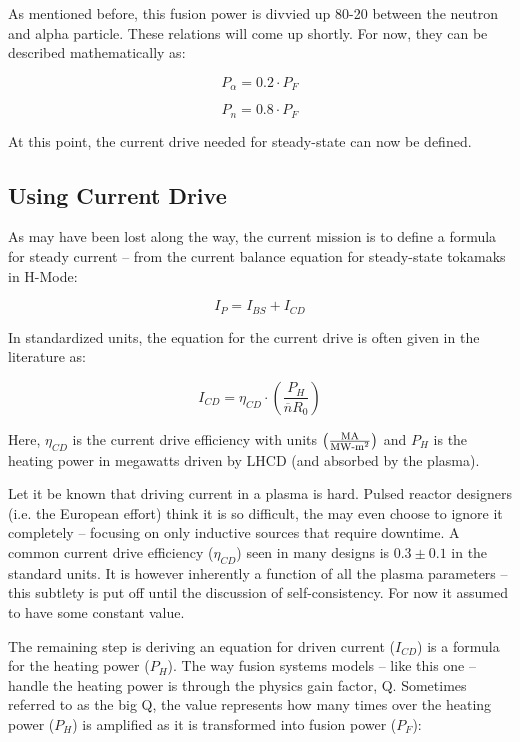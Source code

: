 As mentioned before, this fusion power is divvied up 80-20 between the neutron and alpha particle. These relations will come up shortly. For now, they can be described mathematically as:

\begin{equation}
	P_\alpha = 0.2 \cdot P_F
\end{equation}

\begin{equation}
	P_n = 0.8 \cdot P_F
\end{equation}

At this point, the current drive needed for steady-state can now be defined.

\subsection{Using Current Drive}

As may have been lost along the way, the current mission is to define a formula for steady current -- from the current balance equation for steady-state tokamaks in H-Mode:

\begin{equation}
	\label{eq:ibal}
	I_P = I_{BS} + I_{CD}
\end{equation}

In standardized units, the equation for the current drive is often given in the literature as:

\begin{equation}
	I_{CD} = \eta_{CD} \cdot \left( \frac{P_H}{\overline n R_0} \right)
\end{equation}

Here, $\eta_{CD}$ is the current drive efficiency with units $ \left(
\frac{ \textnormal{MA} }{ \textnormal{MW-m}^2 } \right) $ and $P_H$ is the heating power in megawatts driven by LHCD (and absorbed by the plasma).

Let it be known that driving current in a plasma is hard. Pulsed reactor designers (i.e. the European effort) think it is so difficult, the may even choose to ignore it completely -- focusing on only inductive sources that require downtime. A common current drive efficiency ($\eta_{CD}$) seen in many designs is $0.3 \pm 0.1 $ in the standard units. It is however inherently a function of all the plasma parameters -- this subtlety is put off until the discussion of self-consistency. For now it assumed to have some constant value.

The remaining step is deriving an equation for driven current ($I_{CD}$) is a formula for the heating power ($P_H$). The way fusion systems models -- like this one -- handle the heating power is through the physics gain factor, Q. Sometimes referred to as the big Q, the value represents how many times over the heating power ($P_H$) is amplified as it is transformed into fusion power ($P_F$):

